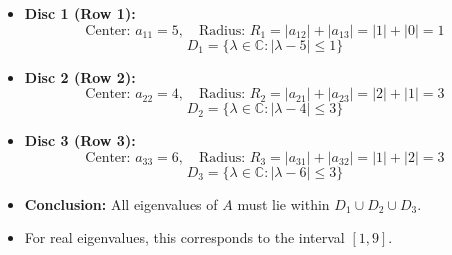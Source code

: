 \begin{frame}{}
    \begin{itemize}
       \item \textbf{Disc 1 (Row 1):}
       \[
    \text{Center: } a_{11} = 5, \quad \text{Radius: } R_1 = |a_{12}| + |a_{13}| = |1| + |0| = 1
    \]
    \[
    D_1 = \{ \lambda \in \mathbb{C} : |\lambda - 5| \leq 1 \}
    \]

    \item \textbf{Disc 2 (Row 2):}
    \[
    \text{Center: } a_{22} = 4, \quad \text{Radius: } R_2 = |a_{21}| + |a_{23}| = |2| + |1| = 3
    \]
    \[
    D_2 = \{ \lambda \in \mathbb{C} : |\lambda - 4| \leq 3 \}
    \]
    
    \end{itemize}
\end{frame}

\begin{frame}{}
\begin{itemize}
  \item \textbf{Disc 3 (Row 3):}
    \[
    \text{Center: } a_{33} = 6, \quad \text{Radius: } R_3 = |a_{31}| + |a_{32}| = |1| + |2| = 3
    \]
    \[
    D_3 = \{ \lambda \in \mathbb{C} : |\lambda - 6| \leq 3 \}
    \]
    \item \textbf{Conclusion:} All eigenvalues of $A$ must lie within $D_1 \cup D_2 \cup D_3$.
    \item For real eigenvalues, this corresponds to the interval $[1, 9]$.
\end{itemize}
\end{frame}




